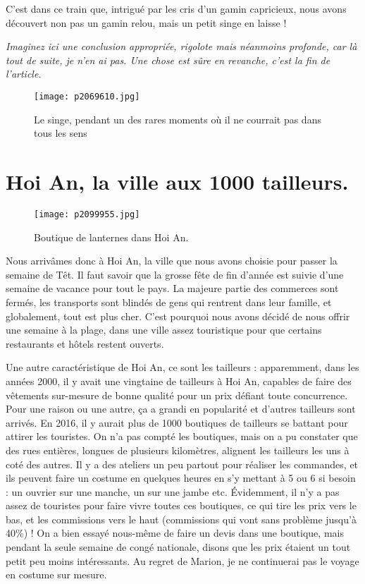 \documentclass{book}
\begin{document}
C'est dans ce train que, intrigué par les cris d'un gamin capricieux, nous avons découvert non pas un gamin relou, mais un petit singe en laisse !

\emph{Imaginez ici une conclusion appropriée, rigolote mais néanmoins profonde, car là tout de suite, je n'en ai pas. Une chose est sûre en revanche, c'est la fin de l'article.}


\begin{figure}[h]
\centering
\texttt{[image: p2069610.jpg]}
\caption*{Le singe, pendant un des rares moments où il ne courrait pas dans tous les sens}
\end{figure}



\chapter{Hoi An, la ville aux 1000 tailleurs.}

\begin{wrapfigure}{l}{0.55\textwidth}
\centering
\texttt{[image: p2099955.jpg]}
\caption*{Boutique de lanternes dans Hoi An.}
\end{wrapfigure}

Nous arrivâmes donc à Hoi An, la ville que nous avons choisie pour passer la semaine de Têt. Il faut savoir que la grosse fête de fin d'année est suivie d'une semaine de vacance pour tout le pays. La majeure partie des commerces sont fermés, les transports sont blindés de gens qui rentrent dans leur famille, et globalement, tout est plus cher. C'est pourquoi nous avons décidé de nous offrir une semaine à la plage, dans une ville assez touristique pour que certains restaurants et hôtels restent ouverts.





Une autre caractéristique de Hoi An, ce sont les tailleurs : apparemment, dans les années 2000, il y avait une vingtaine de tailleurs à Hoi An, capables de faire des vêtements sur-mesure de bonne qualité pour un prix défiant toute concurrence. Pour une raison ou une autre, ça a grandi en popularité et d'autres tailleurs sont arrivés. En 2016, il y aurait plus de 1000 boutiques de tailleurs se battant pour attirer les touristes. On n'a pas compté les boutiques, mais on a pu constater que des rues entières, longues de plusieurs kilomètres, alignent les tailleurs les uns à coté des autres. Il y a des ateliers un peu partout pour réaliser les commandes, et ils peuvent faire un costume en quelques heures en s'y mettant à 5 ou 6 si besoin : un ouvrier sur une manche, un sur une jambe etc. Évidemment, il n'y a pas assez de touristes pour faire vivre toutes ces boutiques, ce qui tire les prix vers le bas, et les commissions vers le haut (commissions qui vont sans problème jusqu'à 40\%) ! On a bien essayé nous-même de faire un devis dans une boutique, mais pendant la seule semaine de congé nationale, disons que les prix étaient un tout petit peu moins intéressants. Au regret de Marion, je ne continuerai pas le voyage en costume sur mesure.
\end{document}

